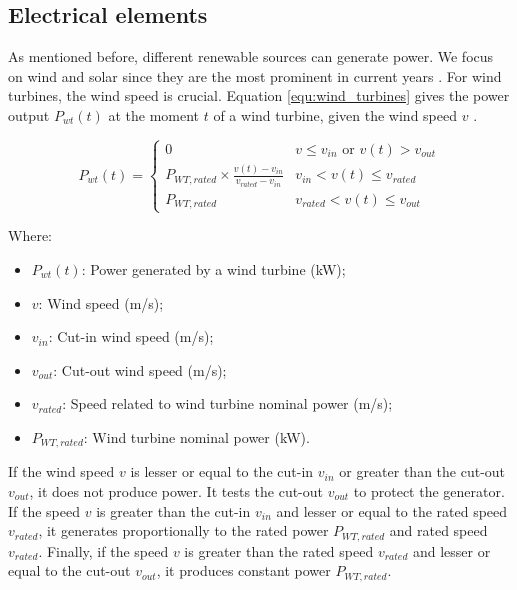 
\subsection{Electrical elements}
\label{sec:related_work_electrical_elements}
As mentioned before, different renewable sources can generate power. We focus on wind and solar since they are the most prominent in current years \cite{renewables2022}. For wind turbines, the wind speed is crucial. Equation \ref{equ:wind_turbines} gives the power output $P_{wt}(t)$ at the moment $t$ of a wind turbine, given the wind speed $v$ \cite{garcia2006wind, dong2016optimal, maleki2015optimal}.

\begin{equation}
    \label{equ:wind_turbines}
    P_{wt}(t) = \begin{cases}
        0 & v \leq v_{in} \text{ or } v(t) > v_{out} \\
        P_{WT,rated} \times \frac{v(t) - v_{in}}{v_{rated} - v_{in}} & v_{in} < v(t) \leq v_{rated} \\
        P_{WT,rated} & v_{rated} < v(t) \leq v_{out}
    \end{cases}
\end{equation}

Where:
\begin{itemize}
    \item $P_{wt}(t)$: Power generated by a wind turbine (kW);
    \item $v$: Wind speed (m/s);
    \item $v_{in}$: Cut-in wind speed (m/s);
    \item $v_{out}$: Cut-out wind speed (m/s);
    \item $v_{rated}$: Speed related to wind turbine nominal power (m/s);
    \item $P_{WT,rated}$: Wind turbine nominal power (kW).
\end{itemize}

If the wind speed $v$ is lesser or equal to the cut-in $v_{in}$  or greater than the cut-out $v_{out}$, it does not produce power. It tests the cut-out $v_{out}$ to protect the generator. If the speed $v$ is greater than the cut-in $v_{in}$ and lesser or equal to the rated speed $v_{rated}$, it generates proportionally to the rated power $P_{WT,rated}$ and rated speed $v_{rated}$. Finally, if the speed $v$ is greater than the rated speed $v_{rated}$ and lesser or equal to the cut-out $v_{out}$, it produces constant power $P_{WT,rated}$. 

